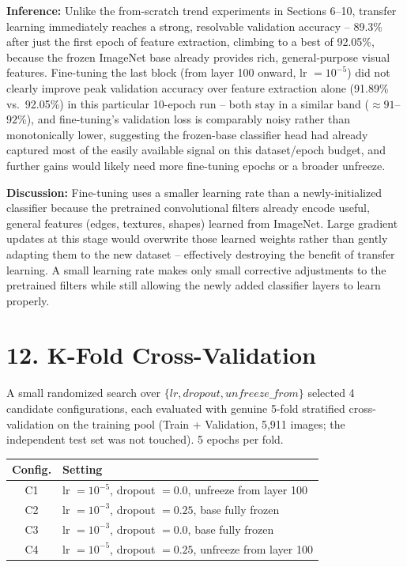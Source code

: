\documentclass[10pt]{article}
\begin{document}
\textbf{Inference:} Unlike the from-scratch trend experiments in
Sections 6--10, transfer learning immediately reaches a strong,
resolvable validation accuracy -- 89.3\% after just the first epoch of
feature extraction, climbing to a best of 92.05\%, because the frozen
ImageNet base already provides rich, general-purpose visual features.
Fine-tuning the last block (from layer 100 onward, lr $=10^{-5}$) did not
clearly improve peak validation accuracy over feature extraction alone
(91.89\% vs.\ 92.05\%) in this particular 10-epoch run -- both stay in a
similar band ($\approx91$--$92\%$), and fine-tuning's validation loss is
comparably noisy rather than monotonically lower, suggesting the
frozen-base classifier head had already captured most of the easily
available signal on this dataset/epoch budget, and further gains would
likely need more fine-tuning epochs or a broader unfreeze.

\textbf{Discussion:} Fine-tuning uses a smaller learning rate than a
newly-initialized classifier because the pretrained convolutional filters
already encode useful, general features (edges, textures, shapes) learned
from ImageNet. Large gradient updates at this stage would overwrite those
learned weights rather than gently adapting them to the new dataset --
effectively destroying the benefit of transfer learning. A small learning
rate makes only small corrective adjustments to the pretrained filters
while still allowing the newly added classifier layers to learn properly.

\section*{12. K-Fold Cross-Validation}

A small randomized search over $\{lr, dropout, unfreeze\_from\}$ selected
4 candidate configurations, each evaluated with genuine 5-fold
stratified cross-validation on the training pool (Train + Validation,
5{,}911 images; the independent test set was not touched). 5 epochs per
fold.

\begin{center}
\begin{tabular}{|c|l|}
\hline
Config. & Setting\\
\hline
C1 & lr $=10^{-5}$, dropout $=0.0$, unfreeze from layer 100\\
C2 & lr $=10^{-3}$, dropout $=0.25$, base fully frozen\\
C3 & lr $=10^{-3}$, dropout $=0.0$, base fully frozen\\
C4 & lr $=10^{-5}$, dropout $=0.25$, unfreeze from layer 100\\
\hline
\end{tabular}
\end{center}
\end{document}
